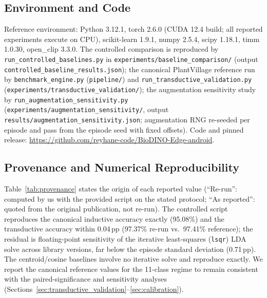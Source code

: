 \documentclass[preprint,12pt]{elsarticle}
\begin{document}
\subsection{Environment and Code}
Reference environment: Python 3.12.1, torch 2.6.0 (CUDA 12.4 build; all reported experiments execute on CPU), scikit-learn 1.9.1, numpy 2.5.4, scipy 1.18.1, timm 1.0.30, open\_clip 3.3.0. The controlled comparison is reproduced by \texttt{run\_controlled\_baselines.py} in \texttt{experiments/baseline\_comparison/} (output \texttt{controlled\_baseline\_results.json}); the canonical PlantVillage reference run by \texttt{benchmark\_engine.py} (\texttt{pipeline/}) and \texttt{run\_transductive\_validation.py} (\texttt{experiments/transductive\_validation/}); the augmentation sensitivity study by \texttt{run\_augmentation\_sensitivity.py} (\texttt{experiments/augmentation\_sensitivity/}, output \texttt{results/augmentation\_sensitivity.json}; augmentation RNG re-seeded per episode and pass from the episode seed with fixed offsets). Code and pinned release: \url{https://github.com/reyhane-code/BioDINO-Edge-android}.

\subsection{Provenance and Numerical Reproducibility}
Table~\ref{tab:provenance} states the origin of each reported value (``Re-run'': computed by us with the provided script on the stated protocol; ``As reported'': quoted from the original publication, not re-run). The controlled script reproduces the canonical inductive accuracy exactly (95.08\%) and the transductive accuracy within 0.04\,pp (97.37\% re-run vs.\ 97.41\% reference); the residual is floating-point sensitivity of the iterative least-squares (\texttt{lsqr}) LDA solve across library versions, far below the episode standard deviation (0.71\,pp). The centroid/cosine baselines involve no iterative solve and reproduce exactly. We report the canonical reference values for the 11-class regime to remain consistent with the paired-significance and sensitivity analyses (Sections~\ref{sec:transductive_validation}--\ref{sec:calibration}).
\end{document}
